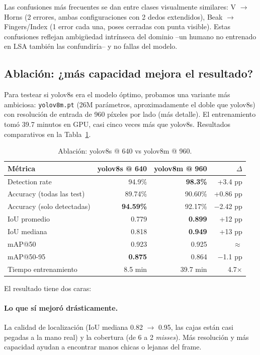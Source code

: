 \documentclass[a4paper,11pt]{article}
\begin{document}
Las confusiones más frecuentes se dan entre clases visualmente similares: V $\rightarrow$ Horns (2 errores, ambas configuraciones con 2 dedos extendidos), Beak $\rightarrow$ Fingers/Index (1 error cada una, poses cerradas con punta visible). Estas confusiones reflejan ambigüedad intrínseca del dominio --un humano no entrenado en LSA también las confundiría-- y no fallas del modelo.

\subsection{Ablación: ¿más capacidad mejora el resultado?}

Para testear si yolov8s era el modelo óptimo, probamos una variante más ambiciosa: \texttt{yolov8m.pt} (26M parámetros, aproximadamente el doble que yolov8s) con resolución de entrada de 960 píxeles por lado (más detalle). El entrenamiento tomó 39.7 minutos en GPU, casi cinco veces más que yolov8s. Resultados comparativos en la Tabla~\ref{tab:yolo-ablation}.

\begin{table}[h]
\centering
\caption{Ablación: yolov8s @ 640 vs yolov8m @ 960.}
\label{tab:yolo-ablation}
\begin{tabular}{lrrr}
\toprule
\textbf{Métrica} & \textbf{yolov8s @ 640} & \textbf{yolov8m @ 960} & \textbf{$\Delta$} \\
\midrule
Detection rate & 94.9\% & \textbf{98.3\%} & +3.4 pp \\
Accuracy (todas las test) & 89.74\% & 90.60\% & +0.86 pp \\
Accuracy (solo detectadas) & \textbf{94.59\%} & 92.17\% & $-$2.42 pp \\
IoU promedio & 0.779 & \textbf{0.899} & +12 pp \\
IoU mediana & 0.818 & \textbf{0.949} & +13 pp \\
mAP@50 & 0.923 & 0.925 & $\approx$ \\
mAP@50-95 & \textbf{0.875} & 0.864 & $-$1.1 pp \\
Tiempo entrenamiento & 8.5 min & 39.7 min & 4.7$\times$ \\
\bottomrule
\end{tabular}
\end{table}

El resultado tiene dos caras:

\paragraph{Lo que sí mejoró drásticamente.} La calidad de localización (IoU mediana 0.82 $\rightarrow$ 0.95, las cajas están casi pegadas a la mano real) y la cobertura (de 6 a 2 \textit{misses}). Más resolución y más capacidad ayudan a encontrar manos chicas o lejanas del frame.
\end{document}
